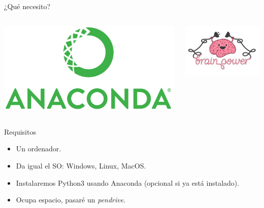 \documentclass[bigger,unknownkeysallowed]{beamer}
\begin{document}
\begin{frame}[label={sec:orge76284a}]{¿Qué necesito?}
\begin{columns}
\begin{column}{0.3\columnwidth}
\begin{center}
\begin{center}
\includegraphics[width=.8\textwidth]{logo-anaconda.png}
\end{center}
\end{center}
\end{column}
\begin{column}{0.3\columnwidth}
\begin{center}
\begin{center}
\includegraphics[width=\textwidth]{brain3.jpg}
\end{center}
\end{center}
\end{column}
\end{columns}

\begin{block}{Requisitos}
\begin{itemize}
\item Un ordenador.

\item Da igual el SO: Windows, Linux, MacOS.

\item Instalaremos Python3 usando Anaconda (opcional si ya está instalado).

\item Ocupa espacio, pasaré un \emph{pendrive}.
\end{itemize}
\end{block}
\end{frame}
\end{document}
